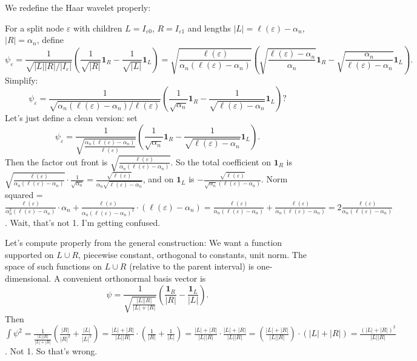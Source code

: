 \documentclass[11pt,a4paper]{article}
\begin{document}
We redefine the Haar wavelet properly:

For a split node \(\varepsilon\) with children \(L = I_{\varepsilon0}\), \(R = I_{\varepsilon1}\) and lengths \(|L| = \ell(\varepsilon) - \alpha_n\), \(|R| = \alpha_n\), define
\[
\psi_\varepsilon = \frac{1}{\sqrt{|L||R|/|I_\varepsilon|}} \left( \frac{1}{\sqrt{|R|}}\mathbf{1}_{R} - \frac{1}{\sqrt{|L|}}\mathbf{1}_{L} \right)
= \sqrt{ \frac{\ell(\varepsilon)}{\alpha_n (\ell(\varepsilon)-\alpha_n)} } \left( \sqrt{ \frac{\ell(\varepsilon)-\alpha_n}{\alpha_n} } \mathbf{1}_{R} - \sqrt{ \frac{\alpha_n}{\ell(\varepsilon)-\alpha_n} } \mathbf{1}_{L} \right).
\]
Simplify: 
\[
\psi_\varepsilon = \frac{1}{\sqrt{ \alpha_n (\ell(\varepsilon)-\alpha_n) / \ell(\varepsilon) }} \left( \frac{1}{\sqrt{\alpha_n}} \mathbf{1}_{R} - \frac{1}{\sqrt{\ell(\varepsilon)-\alpha_n}} \mathbf{1}_{L} \right) ? 
\]
Let's just define a clean version: set
\[
\psi_\varepsilon = \frac{1}{\sqrt{ \frac{\alpha_n(\ell(\varepsilon)-\alpha_n)}{\ell(\varepsilon)} }} \left( \frac{1}{\sqrt{\alpha_n}} \mathbf{1}_{R} - \frac{1}{\sqrt{\ell(\varepsilon)-\alpha_n}} \mathbf{1}_{L} \right).
\]
Then the factor out front is \(\sqrt{ \frac{\ell(\varepsilon)}{\alpha_n(\ell(\varepsilon)-\alpha_n)} }\). So the total coefficient on \(\mathbf{1}_R\) is \(\sqrt{ \frac{\ell(\varepsilon)}{\alpha_n(\ell(\varepsilon)-\alpha_n)} } \cdot \frac{1}{\sqrt{\alpha_n}} = \frac{\sqrt{\ell(\varepsilon)}}{\alpha_n\sqrt{\ell(\varepsilon)-\alpha_n}}\), and on \(\mathbf{1}_L\) is \(-\frac{\sqrt{\ell(\varepsilon)}}{\sqrt{\alpha_n}(\ell(\varepsilon)-\alpha_n)}\). Norm squared = \(\frac{\ell(\varepsilon)}{\alpha_n^2 (\ell(\varepsilon)-\alpha_n)} \cdot \alpha_n + \frac{\ell(\varepsilon)}{\alpha_n (\ell(\varepsilon)-\alpha_n)^2} \cdot (\ell(\varepsilon)-\alpha_n) = \frac{\ell(\varepsilon)}{\alpha_n (\ell(\varepsilon)-\alpha_n)} + \frac{\ell(\varepsilon)}{\alpha_n (\ell(\varepsilon)-\alpha_n)} = 2 \frac{\ell(\varepsilon)}{\alpha_n (\ell(\varepsilon)-\alpha_n)}\). Wait, that's not 1. I'm getting confused.

Let's compute properly from the general construction: We want a function supported on \(L\cup R\), piecewise constant, orthogonal to constants, unit norm. The space of such functions on \(L\cup R\) (relative to the parent interval) is one-dimensional. A convenient orthonormal basis vector is 
\[
\psi = \frac{1}{\sqrt{ \frac{|L||R|}{|L|+|R|} }} \left( \frac{\mathbf{1}_R}{|R|} - \frac{\mathbf{1}_L}{|L|} \right).
\]
Then \(\int \psi^2 = \frac{1}{ \frac{|L||R|}{|L|+|R|} } \left( \frac{|R|}{|R|^2} + \frac{|L|}{|L|^2} \right) = \frac{|L|+|R|}{|L||R|} \cdot \left( \frac{1}{|R|} + \frac{1}{|L|} \right) = \frac{|L|+|R|}{|L||R|} \cdot \frac{|L|+|R|}{|L||R|} = \left( \frac{|L|+|R|}{|L||R|} \right) \cdot (|L|+|R|) = \frac{(|L|+|R|)^2}{|L||R|}\). Not 1. So that's wrong.
\end{document}
